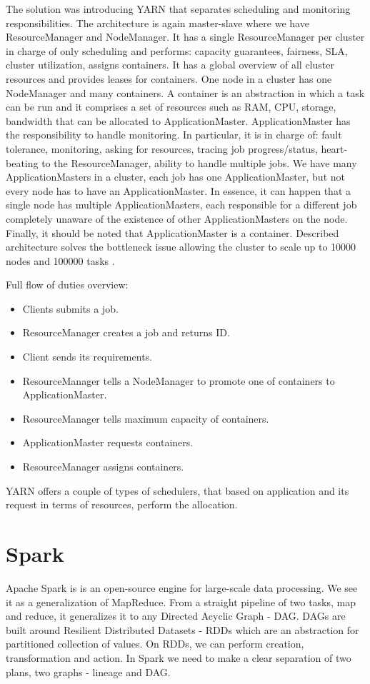 The solution was introducing YARN that separates scheduling and monitoring responsibilities. The architecture is again master-slave where we have ResourceManager and NodeManager. It has a single ResourceManager per cluster in charge of only scheduling and performs: capacity guarantees, fairness, SLA, cluster utilization, assigns containers. It has a global overview of all cluster resources and provides leases for containers. One node in a cluster has one NodeManager and many containers. A container is an abstraction in which a task can be run and it comprises a set of resources such as RAM, CPU, storage, bandwidth that can be allocated to ApplicationMaster. ApplicationMaster has the responsibility to handle monitoring. In particular, it is in charge of: fault tolerance, monitoring, asking for resources, tracing job progress/status, heart-beating to the ResourceManager, ability to handle multiple jobs. We have many ApplicationMasters in a cluster, each job has one ApplicationMaster, but not every node has to have an ApplicationMaster. In essence, it can happen that a single node has multiple ApplicationMasters, each responsible for a different job completely unaware of the existence of other ApplicationMasters on the node. Finally, it should be noted that ApplicationMaster is a container. Described architecture solves the bottleneck issue allowing the cluster to scale up to 10000 nodes and 100000 tasks \cite{BigDataCourse}. %

Full flow of duties overview:
\begin{itemize}
	\item Clients submits a job. 
	\item ResourceManager creates a job and returns ID. \item Client sends its requirements. 
	\item ResourceManager tells a NodeManager to promote one of containers to ApplicationMaster. 
	\item ResourceManager tells maximum capacity of containers. 
	\item ApplicationMaster requests containers. 
	\item ResourceManager assigns containers.
\end{itemize}


YARN offers a couple of types of schedulers, that based on application and its request in terms of resources, perform the allocation.

\section{Spark}
Apache Spark \cite{ApacheSpark} \cite{SparkDefinitiveGuide} \cite{LearningSpark} is is an open-source engine for large-scale data processing. We see it as a generalization of MapReduce. From a straight pipeline of two tasks, map and reduce, it generalizes it to any Directed Acyclic Graph - DAG. DAGs are built around Resilient Distributed Datasets - RDDs \cite{RDD} which are an abstraction for partitioned collection of values. On RDDs, we can perform creation, transformation and action. In Spark we need to make a clear separation of two plans, two graphs - lineage and DAG.

